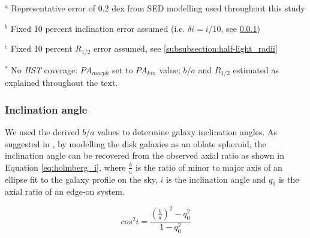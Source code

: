 \documentclass[fleqn,usenatbib]{mnras}
\begin{document}
\begin{table*}
\begin{threeparttable}
\begin{tablenotes}
      \small
      \item $^{a}$ Representative error of 0.2 dex from SED modelling used throughout this study
      \item $^{b}$ Fixed 10 percent inclination error assumed (i.e. $\delta i = i / 10$, see \protect\cref{subsubsection:inclination_angle})
      \item $^{c}$ Fixed 10 percent $R_{1/2}$ error assumed, see \protect\cref{subsubsection:half-light_radii}
      \item $^{*}$ No {\em HST} coverage: $PA_{morph}$ set to $PA_{kin}$ value; $b/a$ and $R_{1/2}$ estimated as explained throughout the text.
    \end{tablenotes}
  \end{threeparttable}
  \end{table*}


\subsubsection{Inclination angle}\label{subsubsection:inclination_angle}
We used the derived $b/a$ values to determine galaxy inclination angles.
As suggested in \cite{Holmberg1958}, by modelling the disk galaxies as an oblate spheroid, the inclination angle can be recovered from the observed axial ratio as shown in Equation \ref{eq:holmberg_i}, where $\frac{b}{a}$ is the ratio of minor to major axis of an ellipse fit to the galaxy profile on the sky, $i$ is the inclination angle and $q_{0}$ is the axial ratio of an edge-on system.

\begin{equation}\label{eq:holmberg_i}
   cos^{2}i = \frac{\left(\frac{b}{a}\right)^{2} - q_{0}^{2}}{1 - q_{0}^{2}}
\end{equation}
\end{document}
